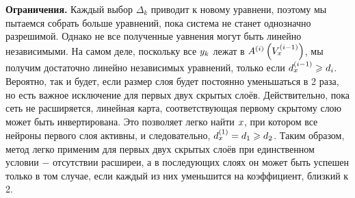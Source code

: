 \textbf{Ограничения.} Каждый выбор $\mathit{\Delta}_{k}$ приводит к новому уравнени, поэтому мы пытаемся собрать больше уравнений, пока система не станет однозначно разрешимой. Однако не все полученные уавнения могут быть линейно независимыми. На самом деле, поскольку все $\mathnormal{y}_{k}$ лежат в $A^{\left(i\right)}\left(V_{\mathnormal{x}}^{\left(i-1\right)}\right)$, мы получим достаточно линейно независимых уравнений, только если $d_{\mathnormal{x}}^{\left(i-1\right)} \ge d_{i}$. Вероятно, так и будет, если размер слоя будет постоянно уменьшаться в 2 раза, но есть важное исключение для первых двух скрытых слоёв. Действительно, пока сеть не расширяется, линейная карта, соответствующая первому скрытому слою может быть инвертирована. Это позволяет легко найти $\mathnormal{x}$,  при котором все нейроны первого слоя активны, и следовательно, $d_{\mathnormal{x}}^{\left(1\right)}  = d_{1} \ge d_{2}$. Таким образом, метод легко применим для первых двух скрытых слоёв при единственном условии $-$ отсутствии расширеи, а в последующих слоях он может быть успешен только в том случае, если каждый из них уменьшится на коэффициент, близкий к 2.

